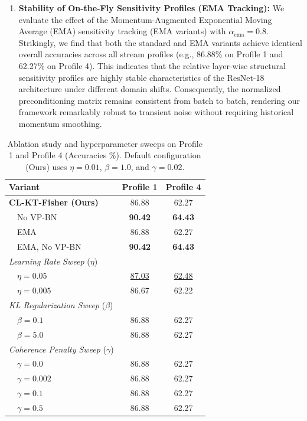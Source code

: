 \documentclass{article}
\theoremstyle{plain}
\theoremstyle{definition}
\theoremstyle{remark}
\begin{document}
\begin{enumerate}
    \item \textbf{Stability of On-the-Fly Sensitivity Profiles (EMA Tracking):} We evaluate the effect of the Momentum-Augmented Exponential Moving Average (EMA) sensitivity tracking (\textsf{EMA} variants) with $\alpha_{\text{ema}} = 0.8$. Strikingly, we find that both the standard and EMA variants achieve identical overall accuracies across all stream profiles (e.g., 86.88\% on Profile 1 and 62.27\% on Profile 4). This indicates that the relative layer-wise structural sensitivity profiles are highly stable characteristics of the ResNet-18 architecture under different domain shifts. Consequently, the normalized preconditioning matrix remains consistent from batch to batch, rendering our framework remarkably robust to transient noise without requiring historical momentum smoothing.
\end{enumerate}

\begin{table}[t]
\centering
\caption{Ablation study and hyperparameter sweeps on Profile 1 and Profile 4 (Accuracies \%). Default configuration (Ours) uses $\eta=0.01$, $\beta=1.0$, and $\gamma=0.02$.}
\label{tab:ablations}
\vskip 0.15in
\begin{small}
\setlength{\tabcolsep}{5pt}
\begin{tabular}{lcc}
\toprule
Variant & Profile 1 & Profile 4 \\
\midrule
\textbf{CL-KT-Fisher (Ours)} & 86.88 & 62.27 \\
\ \ \textsf{No VP-BN} & \textbf{90.42} & \textbf{64.43} \\
\ \ \textsf{EMA} & 86.88 & 62.27 \\
\ \ \textsf{EMA, No VP-BN} & \textbf{90.42} & \textbf{64.43} \\
\midrule
\textit{Learning Rate Sweep} ($\eta$) & & \\
\ \ $\eta = 0.05$ & \underline{87.03} & \underline{62.48} \\
\ \ $\eta = 0.005$ & 86.67 & 62.22 \\
\midrule
\textit{KL Regularization Sweep} ($\beta$) & & \\
\ \ $\beta = 0.1$ & 86.88 & 62.27 \\
\ \ $\beta = 5.0$ & 86.88 & 62.27 \\
\midrule
\textit{Coherence Penalty Sweep} ($\gamma$) & & \\
\ \ $\gamma = 0.0$ & 86.88 & 62.27 \\
\ \ $\gamma = 0.002$ & 86.88 & 62.27 \\
\ \ $\gamma = 0.1$ & 86.88 & 62.27 \\
\ \ $\gamma = 0.5$ & 86.88 & 62.27 \\
\bottomrule
\end{tabular}
\end{small}
\end{table}
\end{document}
